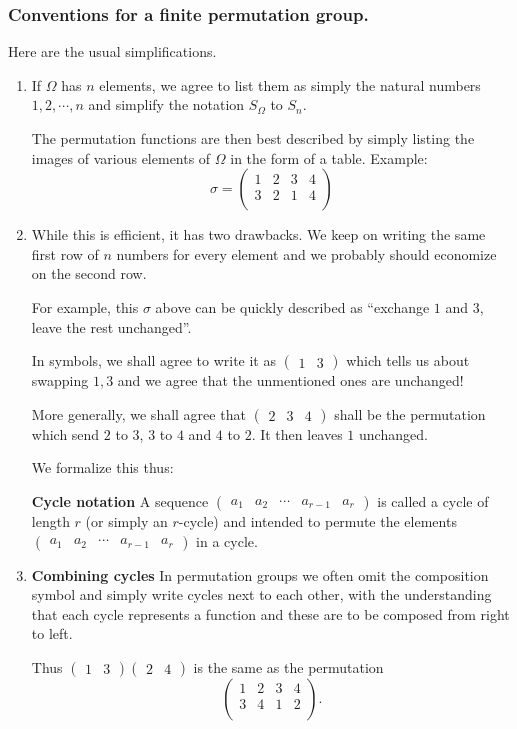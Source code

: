 \documentclass[12pt]{article}
\newcommand{\matr}[2]{\left( \begin{array}{*{#1}{r}}#2\end{array}\right)}
\begin{document}
\subsubsection{Conventions for a finite permutation group.}
Here are the usual simplifications.
\begin{enumerate}
\item
If $\Omega$ has $n$ elements, we agree to list them as simply the
natural numbers $1,2,\cdots,n$ and simplify the notation $S_\Omega$ to
 $S_n$.

The permutation functions are then best described by simply listing 
the images of various elements of $\Omega$ in the form of a table. Example:
$$\sigma =
\matr{4}{1 & 2 & 3 & 4 \\
         3 & 2 & 1 & 4 \\}
         $$

\item While this is efficient, it has two drawbacks. We keep on writing
the same first row of $n$ numbers for every element and we probably
should 
economize on the second row.

For example, this $\sigma$ above can be quickly described as 
``exchange $1$ and $3$, leave the rest unchanged''.

In symbols, we shall agree to write it as $\matr{2}{1 & 3}$ which tells
us about swapping $1,3$ and we agree that the unmentioned ones are
unchanged!

More generally, we shall agree that $\matr{3}{2 & 3 & 4}$ shall be the
permutation which send $2$ to $3$, $3$ to $4$ and $4$ to $2$. It then
leaves $1$ unchanged. 

We formalize this thus:

{\bf Cycle notation} A sequence 
$\matr{5}{a_1 & a_2 & \cdots & a_{r-1} & a_r}$
 is called
a cycle of length $r$ (or simply an $r$-cycle)  and intended to permute the elements 
$\matr{5}{a_1 & a_2 & \cdots & a_{r-1} & a_r}$ in a cycle.


\item {\bf Combining cycles}
In permutation groups we often omit the composition symbol and simply
write cycles next to each other, with the understanding that each cycle
represents a function and these are to be composed from right to left.

Thus $\matr{2}{1 & 3}\matr{2}{2 & 4}$ is the same as the permutation
$$\matr{4}{1 & 2 & 3 & 4\\
           3 & 4 & 1 & 2\\}.$$


\end{enumerate}
\end{document}
